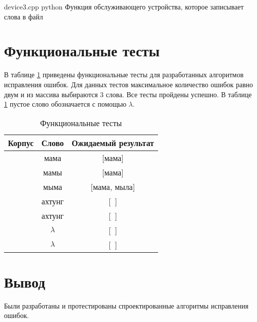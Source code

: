 \clearpage


{device3.cpp} %
{python} %
{Функция обслуживающего устройства, которое записывает слова в файл} %

\clearpage


\section{Функциональные тесты}

В таблице \ref{tbl:func_tests} приведены функциональные тесты для разработанных алгоритмов исправления ошибок. Для данных тестов максимальное количество ошибок равно двум и из массива выбираются 3 слова. Все тесты пройдены успешно. В таблице \ref{tbl:func_tests} пустое слово обозначается с помощью $\lambda$.

\begin{table}[ht]
	\small
	\begin{center}
		\begin{threeparttable}
			\caption{Функциональные тесты}
			\label{tbl:func_tests}
			\begin{tabular}{|c|c|c|}
				\hline
				\bfseries Корпус
				& \bfseries Слово
				& \bfseries Ожидаемый результат \\ 
				\hline
				[мама, мыла, раму] & мама & [мама] \\
				\hline
				[мама, мыла, раму]  & мамы & [мама] \\
				\hline
				[мама, мыла, раму]  & мыма & [мама, мыла] \\
				\hline
				[мама, мыла, раму]  & ахтунг & [~] \\
				\hline
				[~]  & ахтунг & [~] \\
				\hline
				[~]  & $\lambda$ & [~] \\
				\hline
				[Мама, Мыла, Раму]  & $\lambda$ & [~] \\
				\hline
			\end{tabular}	
		\end{threeparttable}	
	\end{center}
\end{table}

\section*{Вывод}
Были разработаны и протестированы спроектированные алгоритмы исправления ошибок.
